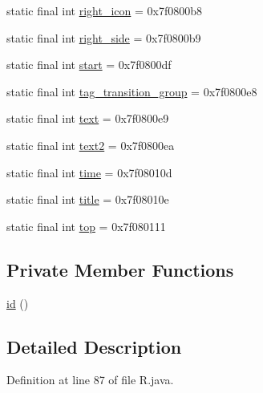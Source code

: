 \begin{DoxyCompactItemize}
\item 
static final int \mbox{\hyperlink{classandroid_1_1support_1_1coreui_1_1_r_1_1id_adec1f27bc9e7d34452d3501276ec7912}{right\+\_\+icon}} = 0x7f0800b8
\item 
static final int \mbox{\hyperlink{classandroid_1_1support_1_1coreui_1_1_r_1_1id_a6292c029de3781e6dc01ec51cc5bd947}{right\+\_\+side}} = 0x7f0800b9
\item 
static final int \mbox{\hyperlink{classandroid_1_1support_1_1coreui_1_1_r_1_1id_a768a6be3fe470d2ceb1edf0168144018}{start}} = 0x7f0800df
\item 
static final int \mbox{\hyperlink{classandroid_1_1support_1_1coreui_1_1_r_1_1id_ad812ff5fab71caccfc5a915eae5634c6}{tag\+\_\+transition\+\_\+group}} = 0x7f0800e8
\item 
static final int \mbox{\hyperlink{classandroid_1_1support_1_1coreui_1_1_r_1_1id_a70077b33c7b9efaa4043b9e75e76b1f7}{text}} = 0x7f0800e9
\item 
static final int \mbox{\hyperlink{classandroid_1_1support_1_1coreui_1_1_r_1_1id_a378fd0235468c7c933faa797d45f4686}{text2}} = 0x7f0800ea
\item 
static final int \mbox{\hyperlink{classandroid_1_1support_1_1coreui_1_1_r_1_1id_a4f5b3260ffc6ddd8ea52933e4e4b18c7}{time}} = 0x7f08010d
\item 
static final int \mbox{\hyperlink{classandroid_1_1support_1_1coreui_1_1_r_1_1id_acd9ab7fdae28f0ae11ffbf38849039fa}{title}} = 0x7f08010e
\item 
static final int \mbox{\hyperlink{classandroid_1_1support_1_1coreui_1_1_r_1_1id_ad51af01ed4af4016a2cfc10b83f10eff}{top}} = 0x7f080111
\end{DoxyCompactItemize}
\subsection*{Private Member Functions}
\begin{DoxyCompactItemize}
\item 
\mbox{\hyperlink{classandroid_1_1support_1_1coreui_1_1_r_1_1id_a482fad231e523dd911633f9f674fdf48}{id}} ()
\end{DoxyCompactItemize}


\subsection{Detailed Description}


Definition at line 87 of file R.\+java.



